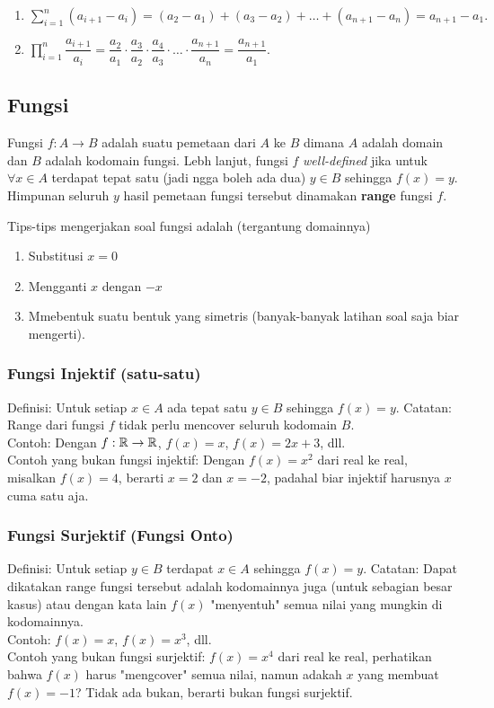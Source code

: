 \documentclass[11pt]{scrartcl}
\begin{document}
    \begin{enumerate}
        \item $\sum_{i=1}^{n} (a_{i+1}-a_{i}) = (a_2-a_1)+(a_3-a_2)+\dots+(a_{n+1}-a_{n}) = a_{n+1}-a_1.$
        \item $\prod_{i=1}^{n} \dfrac{a_{i+1}}{a_i} =  \dfrac{a_2}{a_1}\cdot\dfrac{a_3}{a_2}\cdot\dfrac{a_4}{a_3}\cdot\ldots\cdot\dfrac{a_{n+1}}{a_n} = \dfrac{a_{n+1}}{a_1}.$
    \end{enumerate}
    
    \subsection{Fungsi}
    Fungsi $f : A \rightarrow B$ adalah suatu pemetaan dari $A$ ke $B$ dimana $A$ adalah domain dan $B$ adalah kodomain fungsi. Lebh lanjut, fungsi $f$ \textit{well-defined} jika untuk $\forall x \in A$ terdapat tepat satu (jadi ngga boleh ada dua) $y \in B$ sehingga $f(x)=y$. Himpunan seluruh $y$ hasil pemetaan fungsi tersebut dinamakan \textbf{range} fungsi $f$.
    
    Tips-tips mengerjakan soal fungsi adalah (tergantung domainnya)
    \begin{enumerate}
    \item Substitusi $x=0$
    \item Mengganti $x$ dengan $-x$
    \item Mmebentuk suatu bentuk yang simetris (banyak-banyak latihan soal saja biar mengerti).
    \end{enumerate}
    
    \subsubsection{Fungsi Injektif (satu-satu)}
    Definisi: Untuk setiap $x \in A$ ada tepat satu $y \in B$ sehingga $f(x)=y$. 
    Catatan: Range dari fungsi $f$ tidak perlu mencover seluruh kodomain $B$.\\
    Contoh: Dengan $f: \mathbb R \rightarrow \mathbb R$, $f(x)=x$, $f(x)=2x+3$, dll.\\ 
    Contoh yang bukan fungsi injektif: Dengan $f(x)=x^2$ dari real ke real, misalkan $f(x)=4$, berarti $x=2$ dan $x=-2$, padahal biar injektif harusnya $x$ cuma satu aja.
    
    \subsubsection{Fungsi Surjektif (Fungsi Onto)}
    Definisi: Untuk setiap $y \in B$ terdapat $x \in A$ sehingga $f(x)=y$. 
    Catatan: Dapat dikatakan range fungsi tersebut adalah kodomainnya juga (untuk sebagian besar kasus) atau dengan kata lain $f(x)$ "menyentuh" semua nilai yang mungkin di kodomainnya. \\
    Contoh: $f(x)=x$, $f(x)=x^3$, dll.\\
    Contoh yang bukan fungsi surjektif: $f(x)=x^4$ dari real ke real, perhatikan bahwa $f(x)$ harus "mengcover" semua nilai, namun adakah $x$ yang membuat $f(x)=-1$? Tidak ada bukan, berarti bukan fungsi surjektif.
    
\end{document}
